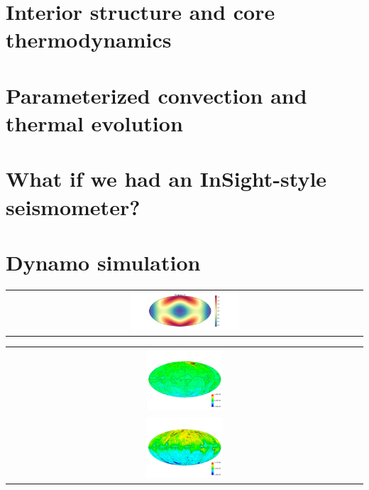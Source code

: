 \documentclass[landscape,a0b,final]{a0poster}
\begin{document}
\begin{multicols}{3}
\section*{Interior structure and core thermodynamics}

\columnbreak

\section*{Parameterized convection and thermal evolution}



\section*{What if we had an InSight-style seismometer?}

\columnbreak

\section*{Dynamo simulation}

\begin{center}
\begin{tabular}{c}
 \includegraphics[width=0.31\textwidth]{CMB_flux.pdf}
\end{tabular}
\label{dynamo}
\end{center}

\begin{center}
\begin{tabular}{c}
 \includegraphics[width=0.22\textwidth]{heterogeneity_dynamo.png} \\
 \includegraphics[width=0.22\textwidth]{no_heterogeneity_dynamo.png}
\end{tabular}
\label{dynamo}
\end{center}


\end{multicols}
\end{document}
